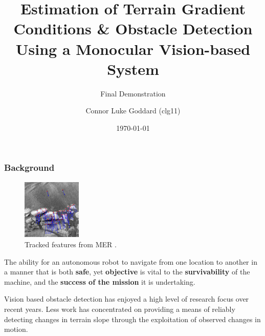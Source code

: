 \documentclass[10pt, compress]{beamer}
\title{Estimation of Terrain Gradient Conditions \& Obstacle Detection Using a Monocular Vision-based System}
\subtitle{Final Demonstration}
\date{\today}
\author{Connor Luke Goddard (clg11)}
\institute{Department of Computer Science, Aberystwyth University}
\begin{document}
\maketitle


\begin{frame}[fragile]
  \frametitle{Background}
	
     \begin{block}{}  

	          \begin{figure}
   \vspace{-20pt}
  \begin{center}
    \includegraphics[width=0.25\textwidth]{mars.jpg}
  \end{center}
  \vspace{-15pt}
  \caption{\small Tracked features from MER \cite{mars}.}
  \end{figure}
  
  The ability for an autonomous robot to navigate from one location to another in a manner that is both \textbf{safe}, yet \textbf{objective} is vital to the \textbf{survivability} of the machine, and the \textbf{success of the mission} it is undertaking.    
		
       \end{block}

\vspace{15pt}
	
   \begin{block}{}
Vision based obstacle detection has enjoyed a high level of research focus over recent years. Less work has concentrated on providing a means of reliably detecting changes in terrain slope through the exploitation of observed changes in motion. 
  \end{block}


\end{frame}
\end{document}
